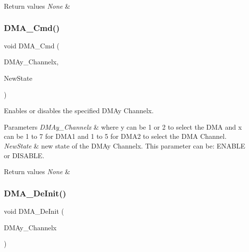 \begin{DoxyRetVals}{Return values}
{\em None} & \\
\hline
\end{DoxyRetVals}
\mbox{\label{group___d_m_a___private___functions_ga8e7cb6b9ae5f142e2961df879cdaba65}} 
\subsubsection{\texorpdfstring{DMA\_Cmd()}{DMA\_Cmd()}}
{\footnotesize\ttfamily void D\+M\+A\+\_\+\+Cmd (\begin{DoxyParamCaption}\item[{\mbox{\hyperlink{struct_d_m_a___channel___type_def}{D\+M\+A\+\_\+\+Channel\+\_\+\+Type\+Def}} $\ast$}]{D\+M\+Ay\+\_\+\+Channelx,  }\item[{\mbox{\hyperlink{group___exported__types_gac9a7e9a35d2513ec15c3b537aaa4fba1}{Functional\+State}}}]{New\+State }\end{DoxyParamCaption})}



Enables or disables the specified D\+M\+Ay Channelx. 


\begin{DoxyParams}{Parameters}
{\em D\+M\+Ay\+\_\+\+Channelx} & where y can be 1 or 2 to select the D\+MA and x can be 1 to 7 for D\+M\+A1 and 1 to 5 for D\+M\+A2 to select the D\+MA Channel. \\
\hline
{\em New\+State} & new state of the D\+M\+Ay Channelx. This parameter can be\+: E\+N\+A\+B\+LE or D\+I\+S\+A\+B\+LE. \\
\hline
\end{DoxyParams}

\begin{DoxyRetVals}{Return values}
{\em None} & \\
\hline
\end{DoxyRetVals}
\mbox{\label{group___d_m_a___private___functions_ga21ca0d50b13e502db5ab5feb484f9ece}} 
\subsubsection{\texorpdfstring{DMA\_DeInit()}{DMA\_DeInit()}}
{\footnotesize\ttfamily void D\+M\+A\+\_\+\+De\+Init (\begin{DoxyParamCaption}\item[{\mbox{\hyperlink{struct_d_m_a___channel___type_def}{D\+M\+A\+\_\+\+Channel\+\_\+\+Type\+Def}} $\ast$}]{D\+M\+Ay\+\_\+\+Channelx }\end{DoxyParamCaption})}



